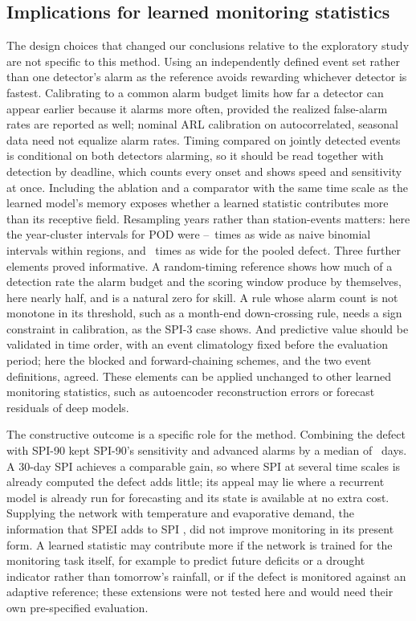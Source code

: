 \documentclass[pdflatex,sn-mathphys-ay]{sn-jnl}
\theoremstyle{thmstyletwo}
\begin{document}
\subsection{Implications for learned monitoring statistics}
The design choices that changed our conclusions relative to the exploratory study are not specific to
this method. Using
an independently defined event set rather than one detector's alarm as the reference avoids rewarding
whichever detector is fastest. Calibrating to a common alarm budget limits how far a detector can appear
earlier because it alarms more often, provided the realized false-alarm rates are reported as well; nominal ARL calibration on autocorrelated, seasonal data need not
equalize alarm rates. Timing compared on jointly detected events is conditional on both detectors
alarming, so it should be read together with detection by deadline, which counts every onset and shows
speed and sensitivity at once. Including
the ablation and a comparator with the same time scale as the learned model's memory exposes whether a
learned statistic contributes more than its receptive field. Resampling years rather than station-events
matters: here the year-cluster intervals for POD were \ciratiolo--\ciratiohi\ times as wide as naive
binomial intervals within regions, and \ciratioall\ times as wide for the pooled defect. Three further
elements proved informative. A random-timing reference shows how much of a detection rate the alarm
budget and the scoring window produce by themselves, here nearly half, and is a natural zero for skill.
A rule whose alarm count is not monotone in its threshold, such as a month-end down-crossing rule, needs
a sign constraint in calibration, as the SPI-3 case shows. And predictive value should be validated in
time order, with an event climatology fixed before the evaluation period; here the blocked and
forward-chaining schemes, and the two event definitions, agreed. These elements
can be applied unchanged to other learned monitoring statistics, such as autoencoder reconstruction
errors or forecast residuals of deep models.

The constructive outcome is a specific role for the method. Combining the defect with SPI-90 kept
SPI-90's sensitivity and advanced alarms by a median of \dtimallDsixDthree\ days. A 30-day SPI achieves
a comparable gain, so where SPI at several time scales is already computed the defect adds little; its
appeal may lie where a recurrent model is already run for forecasting and its state is available at no
extra cost. Supplying the network with temperature and evaporative demand, the information that SPEI adds
to SPI \citep{vicenteserrano2010}, did not improve monitoring in its present form. A learned statistic
may contribute more if the network is trained for the monitoring task itself, for example to predict
future deficits or a drought indicator rather than tomorrow's rainfall, or if the defect is monitored
against an adaptive reference; these extensions were not tested here and would need their own
pre-specified evaluation.
\end{document}
